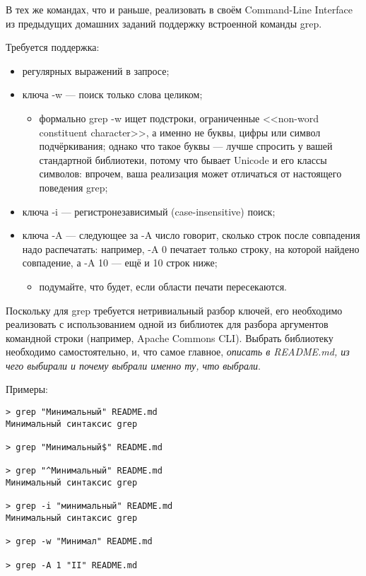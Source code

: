 \documentclass[a5paper]{homework}
\begin{document}

В тех же командах, что и раньше, реализовать в своём Command-Line Interface из предыдущих домашних заданий поддержку встроенной команды grep.

Требуется поддержка:

\begin{itemize}
    \item регулярных выражений в запросе;
    \item ключа -w --- поиск только слова целиком;
    \begin{itemize}
        \item формально grep -w ищет подстроки, ограниченные <<non-word constituent character>>, а именно не буквы, цифры или символ подчёркивания; однако что такое буквы --- лучше спросить у вашей стандартной библиотеки, потому что бывает Unicode и его классы символов: впрочем, ваша реализация может отличаться от настоящего поведения grep;
    \end{itemize}
    \item ключа -i --- регистронезависимый (case-insensitive) поиск;
    \item ключа -A --- следующее за -A число говорит, сколько строк после совпадения надо распечатать: например, -A 0 печатает только строку, на которой найдено совпадение, а -A 10 --- ещё и 10 строк ниже;
    \begin{itemize}
        \item подумайте, что будет, если области печати пересекаются.
    \end{itemize}
\end{itemize}

Поскольку для grep требуется нетривиальный разбор ключей, его необходимо реализовать с использованием одной из библиотек для разбора аргументов командной строки (например, Apache Commons CLI). Выбрать библиотеку необходимо самостоятельно, и, что самое главное, \emph{описать в README.md, из чего выбирали и почему выбрали именно ту, что выбрали}.

Примеры:

\begin{verbatim}
> grep "Минимальный" README.md
Минимальный синтаксис grep

> grep "Минимальный$" README.md

> grep "^Минимальный" README.md
Минимальный синтаксис grep

> grep -i "минимальный" README.md
Минимальный синтаксис grep

> grep -w "Минимал" README.md

> grep -A 1 "II" README.md
\end{verbatim}
\end{document}
